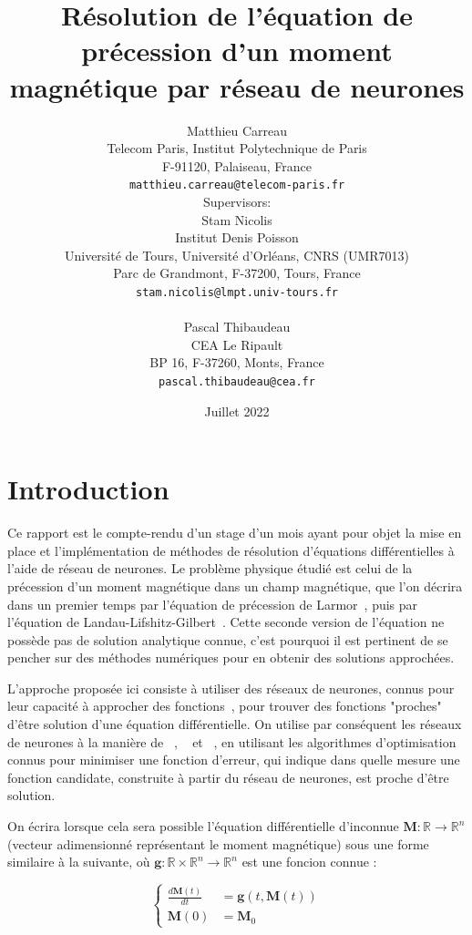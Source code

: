\documentclass[12pt]{report}
\title{Résolution de l'équation de précession d'un moment magnétique par réseau de neurones}
\author{
  Matthieu Carreau\\
  Telecom Paris, Institut Polytechnique de Paris\\
  F-91120, Palaiseau, France\\
  \texttt{matthieu.carreau@telecom-paris.fr} \\
  [1em] Supervisors: \\
  Stam Nicolis\\
  Institut Denis Poisson\\
  Université de Tours, Université d'Orléans, CNRS (UMR7013)\\
  Parc de Grandmont, F-37200, Tours, France\\
  \texttt{stam.nicolis@lmpt.univ-tours.fr}\\
  [1em] \\
  Pascal Thibaudeau\\
  CEA Le Ripault\\
  BP 16, F-37260, Monts, France\\
  \texttt{pascal.thibaudeau@cea.fr}
}
\date{Juillet 2022}
\begin{document}
\maketitle

\begin{abstract}
    {\color{red}{Faire un résumé de ce qu'il y a dans ce document}}
\end{abstract}
    
\tableofcontents{}
    
\chapter{Introduction}
\label{Introduction}

Ce rapport est le compte-rendu d'un stage d'un mois ayant pour objet la mise en place et l'implémentation de méthodes de résolution d'équations différentielles à l'aide de réseau de neurones. 
Le problème physique étudié est celui de la précession d'un moment magnétique dans un champ magnétique, que l'on décrira dans un premier temps par l'équation de précession de Larmor~\cite{PrecessionLarmor}, puis par l'équation de Landau-Lifshitz-Gilbert~\cite{EquationGilbert}.
Cette seconde version de l'équation ne possède pas de solution analytique connue, c'est pourquoi il est pertinent de se pencher sur des méthodes numériques pour en obtenir des solutions approchées.

L'approche proposée ici consiste à utiliser des réseaux de neurones, connus pour leur capacité à approcher des fonctions~\cite{FunctionApproximation}, pour trouver des fonctions "proches" d'être solution d'une équation différentielle.
On utilise par conséquent les réseaux de neurones à la manière de ~\cite{MLWithApp}, ~\cite{ANNforOPDEs} et ~\cite{HighOrderHybrid}, en utilisant les algorithmes d'optimisation connus pour minimiser une fonction d'erreur, qui indique dans quelle mesure une fonction candidate, construite à partir du réseau de neurones, est proche d'être solution.

On écrira lorsque cela sera possible l'équation différentielle d'inconnue $\bm{M}: \mathbb{R} \to  \mathbb{R}^n$ (vecteur adimensionné représentant le moment magnétique) sous une forme similaire à la suivante, où $\bm{g}:  \mathbb{R}\times\mathbb{R}^n \to  \mathbb{R}^n$ est une foncion connue :

\begin{equation}
    \left\{
        \begin{aligned}
            \frac{d\bm{M}(t)}{dt} &= \bm{g}(t, \bm{M}(t)) \\
            \bm{M}(0) &= \bm{M}_0
        \end{aligned}
    \right.
\label{eq:equa dif example}
\end{equation}
\end{document}
